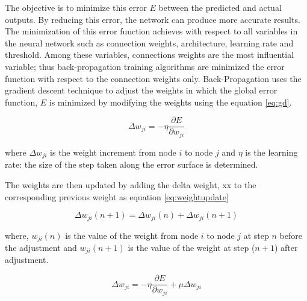 The objective is to minimize this error $E$ between the predicted and actual outputs. By reducing this error, the network can produce more accurate results. The minimization of this error function achieves with respect to all variables in the neural network such as connection weights, architecture, learning rate and threshold. Among these variables, connections weights are the most influential variable; thus back-propagation training algorithms are minimized the error function with respect to the connection weights only. Back-Propagation uses the gradient descent technique to adjust the weights in which the global error function, $E$ is minimized by modifying the weights using the equation \ref{eq:gd}.

\begin{equation}
\Delta{w_{ji}} = -\eta \frac{\partial E}{\partial w_{ji}}
\label{eq:gd}
\end{equation} 

where $\Delta{w_{ji}}$ is the weight increment from node $i$ to node $j$ and $\eta$ is the learning rate: the size of the step taken along the error surface is determined. 

The weights are then updated by adding the delta weight, xx to the corresponding previous weight as equation \ref{eq:weightupdate}

\begin{equation}
\Delta{w_{ji}}(n+1) = \Delta{w_{ji}}(n) + \Delta{w_{ji}}(n+1)
\label{eq:weightupdate}
\end{equation} 

where, $w_{ji}(n)$ is the value of the weight from node $i$ to node $j$ at step $n$ before the adjustment and $w_{ji}(n+1)$ is the value of the weight at step ($n+1$) after adjustment. 

\begin{equation}
\Delta{w_{ji}} = -\eta \frac{\partial E}{\partial w_{ji}} + \mu \Delta{w_{ji}}
\label{eq:momemtum}
\end{equation} 


